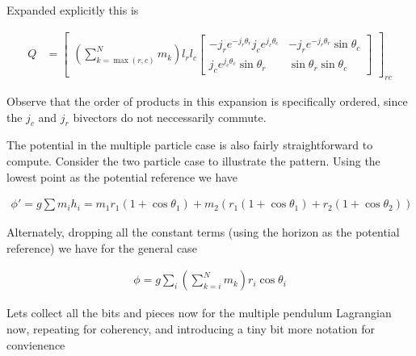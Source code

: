Expanded explicitly this is

\begin{align}\label{eqn:sPolarMultiPendulum:zoo17}
Q &=
{\begin{bmatrix}
\left(\sum_{k=\max(r,c)}^N m_k \right) l_r l_c
\begin{bmatrix}
- j_r e^{-j_r \theta_r} j_c e^{j_c\theta_c} & - j_r e^{-j_r \theta_r} \sin\theta_c \\
j_c e^{j_c \theta_c} \sin\theta_r & \sin\theta_r \sin\theta_c
\end{bmatrix}
\end{bmatrix}}_{rc}
\end{align}

Observe that the order of products in this expansion is specifically ordered, since the $j_c$ and $j_r$ bivectors do not neccessarily commute.

The potential in the multiple particle case is also fairly straightforward to compute.  Consider the two particle case to illustrate the pattern.   Using the lowest point as the potential reference we have

\begin{align}\label{eqn:sPolarMultiPendulum:zoo18}
\phi' = g \sum m_i h_i
= m_1 r_1 (1 + \cos\theta_1) 
+ m_2 \left( r_1(1 + \cos\theta_1) + r_2( 1 + \cos\theta_2) \right)
\end{align}

Alternately, dropping all the constant terms (using the horizon as the potential reference) we have for the general case

\begin{align}\label{eqn:sPolarMultiPendulum:zoo19}
\phi = g \sum_i \left( \sum_{k=i}^N m_k \right) r_i \cos\theta_i
\end{align}

Lets collect all the bits and pieces now for the multiple pendulum Lagrangian now, repeating for coherency, and introducing a tiny bit more notation for convienence


